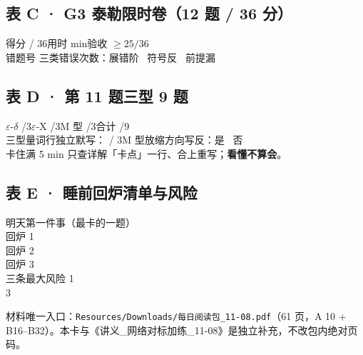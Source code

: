 \documentclass[11pt,a4paper]{ctexart}
\newcommand{\eps}{\varepsilon}
\newcommand{\blank}[1]{\underline{\hspace{#1}}}
\begin{document}
\subsection*{表 C · G3 泰勒限时卷（12 题 / 36 分）}
得分 \blank{1.6cm} / 36\quad 用时 \blank{1.6cm} min\quad 验收 $\ge 25/36$ \blank{1.0cm}\\[2pt]
错题号 \blank{6.5cm}\quad 三类错误次数：展错阶 \blank{0.9cm}\ 符号反 \blank{0.9cm}\ 前提漏 \blank{0.9cm}\\[2pt]

\subsection*{表 D · 第 11 题三型 9 题}
$\eps$-$\delta$ \blank{1.2cm}/3\quad $\eps$-X \blank{1.2cm}/3\quad M 型 \blank{1.2cm}/3\quad 合计 \blank{1.2cm}/9\\[2pt]
三型量词行独立默写：\blank{0.8cm} / 3\quad M 型放缩方向写反：是 \blank{0.7cm}\ 否 \blank{0.7cm}\\[2pt]
卡住满 5 min 只查详解「卡点」一行、合上重写；\textbf{看懂不算会}。\\[2pt]

\subsection*{表 E · 睡前回炉清单与风险}
明天第一件事（最卡的一题） \blank{8.0cm}\\[2pt]
回炉 1 \blank{8.0cm}\\[2pt]
回炉 2 \blank{8.0cm}\\[2pt]
回炉 3 \blank{8.0cm}\\[2pt]
三条最大风险 1 \blank{7.0cm} \blank{7.0cm}\\[2pt]
3 \blank{15.0cm}\\[2pt]

\begin{center}
{\small\color{blue!45!black} 材料唯一入口：\texttt{Resources/Downloads/每日阅读包\_11-08.pdf}（61 页，A 10 + B16--B32）。本卡与《讲义\_网络对标加练\_11-08》是独立补充，不改包内绝对页码。}
\end{center}
\end{document}
